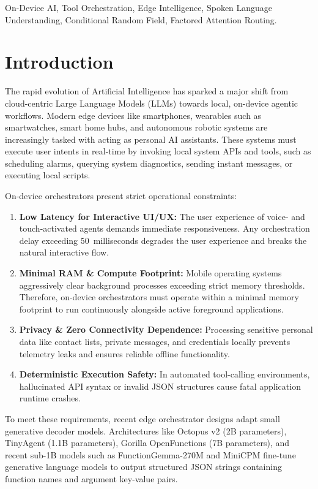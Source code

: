 \documentclass[conference]{IEEEtran}
\begin{document}
\begin{IEEEkeywords}
On-Device AI, Tool Orchestration, Edge Intelligence, Spoken Language Understanding, Conditional Random Field, Factored Attention Routing.
\end{IEEEkeywords}

\section{Introduction}

The rapid evolution of Artificial Intelligence has sparked a major shift from cloud-centric Large Language Models (LLMs) towards local, on-device agentic workflows. Modern edge devices like smartphones, wearables such as smartwatches, smart home hubs, and autonomous robotic systems are increasingly tasked with acting as personal AI assistants. These systems must execute user intents in real-time by invoking local system APIs and tools, such as scheduling alarms, querying system diagnostics, sending instant messages, or executing local scripts.

On-device orchestrators present strict operational constraints:
\begin{enumerate}
    \item \textbf{Low Latency for Interactive UI/UX:} The user experience of voice- and touch-activated agents demands immediate responsiveness. Any orchestration delay exceeding 50~milliseconds degrades the user experience and breaks the natural interactive flow.
    \item \textbf{Minimal RAM \& Compute Footprint:} Mobile operating systems aggressively clear background processes exceeding strict memory thresholds. Therefore, on-device orchestrators must operate within a minimal memory footprint to run continuously alongside active foreground applications.
    \item \textbf{Privacy \& Zero Connectivity Dependence:} Processing sensitive personal data like contact lists, private messages, and credentials locally prevents telemetry leaks and ensures reliable offline functionality.
    \item \textbf{Deterministic Execution Safety:} In automated tool-calling environments, hallucinated API syntax or invalid JSON structures cause fatal application runtime crashes.
\end{enumerate}

To meet these requirements, recent edge orchestrator designs adapt small generative decoder models. Architectures like Octopus v2 \cite{chen2024octopus} (2B parameters), TinyAgent \cite{erdogan2024tinyagent} (1.1B parameters), Gorilla OpenFunctions \cite{patil2023gorilla} (7B parameters), and recent sub-1B models such as FunctionGemma-270M \cite{google2025functiongemma} and MiniCPM \cite{openbmb2024minicpm} fine-tune generative language models to output structured JSON strings containing function names and argument key-value pairs.
\end{document}

